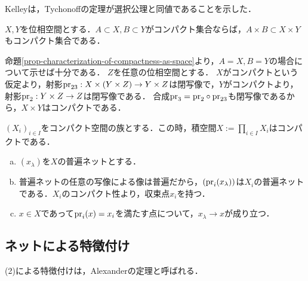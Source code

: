 \documentclass[uplatex,dvipdfmx]{jsreport}
\begin{document}
\begin{tcolorbox}[colframe=ForestGreen, colback=ForestGreen!10!white,breakable,colbacktitle=ForestGreen!40!white,coltitle=black,fonttitle=\bfseries\sffamily,
title=]
    Kelleyは，Tychonoffの定理が選択公理と同値であることを示した．
\end{tcolorbox}

\begin{corollary}[積もコンパクト]\label{cor-product-of-compact-sets-is-compact}
    $X,Y$を位相空間とする．$A\subset X,B\subset Y$がコンパクト集合ならば，$A\times B\subset X\times Y$もコンパクト集合である．
\end{corollary}
\begin{Proof}
    命題\ref{prop-characterization-of-compactness-as-space}より，$A=X,B=Y$の場合について示せば十分である．
    $Z$を任意の位相空間とする．
    $X$がコンパクトという仮定より，射影$\mathrm{pr}_{23}:X\times(Y\times Z)\to Y\times Z$は閉写像で，$Y$がコンパクトより，射影$\mathrm{pr}_2:Y\times Z\to Z$は閉写像である．
    合成$\mathrm{pr}_3=\mathrm{pr}_2\circ\mathrm{pr}_{23}$も閉写像であるから，$X\times Y$はコンパクトである．
\end{Proof}

\begin{theorem}[Tychonoff (AC)]\label{thm-Tychonoff}
    $(X_i)_{i\in I}$をコンパクト空間の族とする．この時，積空間$X:=\prod_{i\in I}X_i$はコンパクトである．
\end{theorem}
\begin{Proof}\mbox{}
    \begin{enumerate}[(a)]
        \item $(x_\lambda)$を$X$の普遍ネットとする．
        \item 普遍ネットの任意の写像による像は普遍だから，$(\mathrm{pr}_i(x_\lambda))$は$X_i$の普遍ネットである．$X_i$のコンパクト性より，収束点$x_i$を持つ．
        \item $x\in X$であって$\mathrm{pr}_i(x)=x_i$を満たす点について，$x_\lambda\to x$が成り立つ．
    \end{enumerate}
\end{Proof}

\subsection{ネットによる特徴付け}

\begin{tcolorbox}[colframe=ForestGreen, colback=ForestGreen!10!white,breakable,colbacktitle=ForestGreen!40!white,coltitle=black,fonttitle=\bfseries\sffamily,
title=]
    (2)による特徴付けは，Alexanderの定理と呼ばれる．
\end{tcolorbox}
\end{document}
